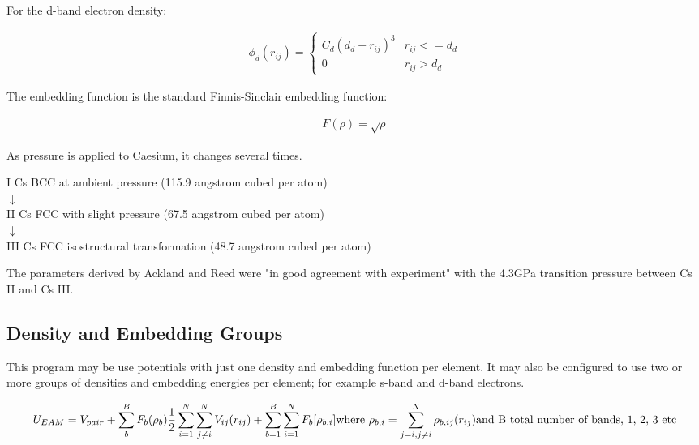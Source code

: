 \documentclass[12pt,twoside]{manual}
\begin{document}
For the d-band electron density:

\begin{equation}
\begin{split}
\phi_{d} (r_{ij}) =%
\begin{cases}
C_d \left(d_d-r_{ij}\right)^3 & r_{ij} <= d_d \\
0 & r_{ij} > d_d
\end{cases}
\end{split}
\label{eq:caesiumDensityD}
\end{equation}

The embedding function is the standard Finnis-Sinclair embedding function:

\begin{equation}
\begin{split}
F(\rho) = \sqrt{\rho}
\end{split}
\label{eq:finnisSinclairEmbedding}
\end{equation}

As pressure is applied to Caesium, it changes several times.

\begin{center}
I     Cs BCC at ambient pressure (115.9 angstrom cubed per atom) \\
$\downarrow$ \\
II    Cs FCC with slight pressure (67.5 angstrom cubed per atom) \\
$\downarrow$ \\
III   Cs FCC isostructural transformation (48.7 angstrom cubed per atom)
\end{center}

The parameters derived by Ackland and Reed were "in good agreement with experiment" with the 4.3GPa transition pressure between Cs II and Cs III.


\subsection{Density and Embedding Groups}

This program may be use potentials with just one density and embedding function per element.  It may also be configured to use two or more groups of densities and embedding energies per element; for example s-band and d-band electrons.



\begin{equation}
\begin{split}
U_{EAM} = V_{pair} + \sum_{b}^B F_b (\rho_b)
\frac{1}{2} \sum \limits_{i=1}^{N} \sum \limits_{j\ne i}^{N} V_{ij}(r_{ij}) + \sum \limits_{b=1}^{B} \sum \limits_{i=1}^{N} F_{b}[\rho _{b,i}]
\textnormal{where   } \rho_{b,i} = \sum \limits_{j=i,j \ne i}^{N} \rho_{b,ij}(r_{ij})
\textnormal{and B total number of bands, 1, 2, 3 etc}
\end{split}
\end{equation}
\end{document}
